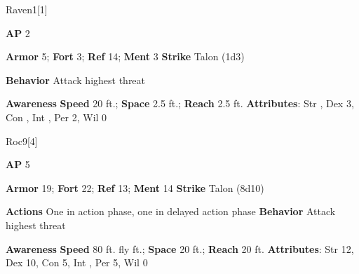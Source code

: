 \begin{monsection}{Raven}{1}[1]
\vspace{-1em}\vspace{-1em}
\begin{spellcontent}
\begin{spelltargetinginfo}
{\textbf{AP} 2}

\pari \textbf{Armor} 5;
\textbf{Fort} 3;
\textbf{Ref} 14;
\textbf{Ment} 3
\pari \textbf{Strike} Talon  (1d3)



\pari \textbf{Behavior} Attack highest threat
\end{spelltargetinginfo}
\end{spellcontent}

\begin{monsterfooter}
\pari \textbf{Awareness} 
\pari \textbf{Speed} 20 ft.;
\textbf{Space} 2.5 ft.;
\textbf{Reach} 2.5 ft.
\pari \textbf{Attributes}:
Str ,
Dex 3,
Con ,
Int ,
Per 2,
Wil 0
\end{monsterfooter}
\end{monsection}

\begin{monsection}{Roc}{9}[4]
\vspace{-1em}\vspace{-1em}
\begin{spellcontent}
\begin{spelltargetinginfo}
{\textbf{AP} 5}

\pari \textbf{Armor} 19;
\textbf{Fort} 22;
\textbf{Ref} 13;
\textbf{Ment} 14
\pari \textbf{Strike} Talon  (8d10)


\pari \textbf{Actions} One in action phase, one in delayed action phase
\pari \textbf{Behavior} Attack highest threat
\end{spelltargetinginfo}
\end{spellcontent}

\begin{monsterfooter}
\pari \textbf{Awareness} 
\pari \textbf{Speed} 80 ft. fly ft.;
\textbf{Space} 20 ft.;
\textbf{Reach} 20 ft.
\pari \textbf{Attributes}:
Str 12,
Dex 10,
Con 5,
Int ,
Per 5,
Wil 0
\end{monsterfooter}
\end{monsection}


